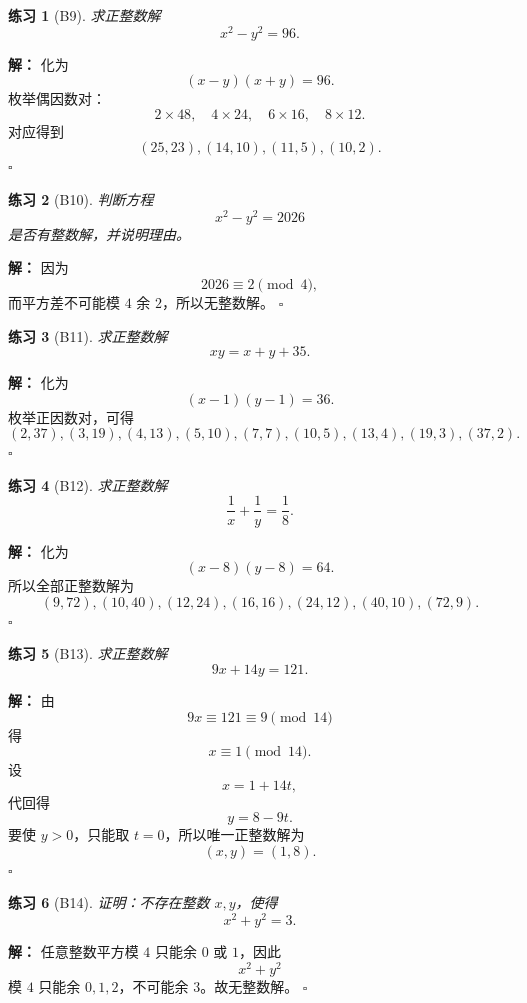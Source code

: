 \documentclass[11pt,a4paper,fontset=fandol]{ctexart}
\theoremstyle{formaltheorem}
\theoremstyle{formalexample}
\newtheorem{exercise}{练习}[section]
\newenvironment{solution}{\par\noindent\textbf{解：}}{\hfill$\square$\par}
\begin{document}
\begin{exercise}[B9]
求正整数解
\[
x^2-y^2=96.
\]
\end{exercise}

\begin{solution}
化为
\[
(x-y)(x+y)=96.
\]
枚举偶因数对：
\[
2\times 48,\quad 4\times 24,\quad 6\times 16,\quad 8\times 12.
\]
对应得到
\[
\boxed{(25,23),(14,10),(11,5),(10,2)}.
\]
\end{solution}

\begin{exercise}[B10]
判断方程
\[
x^2-y^2=2026
\]
是否有整数解，并说明理由。
\end{exercise}

\begin{solution}
因为
\[
2026\equiv 2\pmod 4,
\]
而平方差不可能模 $4$ 余 $2$，所以无整数解。
\end{solution}

\begin{exercise}[B11]
求正整数解
\[
xy=x+y+35.
\]
\end{exercise}

\begin{solution}
化为
\[
(x-1)(y-1)=36.
\]
枚举正因数对，可得
\[
\boxed{(2,37),(3,19),(4,13),(5,10),(7,7),(10,5),(13,4),(19,3),(37,2)}.
\]
\end{solution}

\begin{exercise}[B12]
求正整数解
\[
\frac1x+\frac1y=\frac18.
\]
\end{exercise}

\begin{solution}
化为
\[
(x-8)(y-8)=64.
\]
所以全部正整数解为
\[
\boxed{(9,72),(10,40),(12,24),(16,16),(24,12),(40,10),(72,9)}.
\]
\end{solution}

\begin{exercise}[B13]
求正整数解
\[
9x+14y=121.
\]
\end{exercise}

\begin{solution}
由
\[
9x\equiv 121\equiv 9\pmod{14}
\]
得
\[
x\equiv 1\pmod{14}.
\]
设
\[
x=1+14t,
\]
代回得
\[
y=8-9t.
\]
要使 $y>0$，只能取 $t=0$，所以唯一正整数解为
\[
\boxed{(x,y)=(1,8)}.
\]
\end{solution}

\begin{exercise}[B14]
证明：不存在整数 $x,y$，使得
\[
x^2+y^2=3.
\]
\end{exercise}

\begin{solution}
任意整数平方模 $4$ 只能余 $0$ 或 $1$，因此
\[
x^2+y^2
\]
模 $4$ 只能余 $0,1,2$，不可能余 $3$。故无整数解。
\end{solution}
\end{document}
